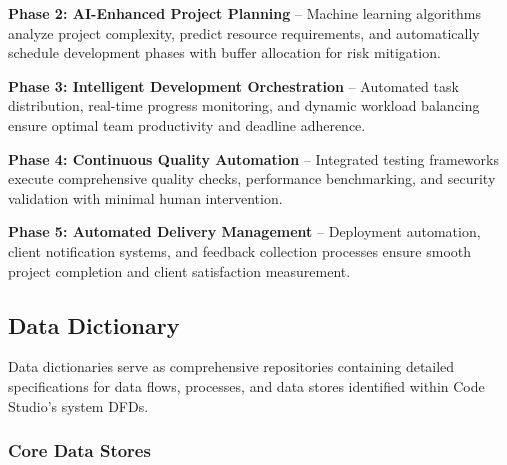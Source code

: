\documentclass[12pt,a4paper]{article}
\begin{document}
\textbf{Phase 2: AI-Enhanced Project Planning} – Machine learning algorithms analyze project complexity, predict resource requirements, and automatically schedule development phases with buffer allocation for risk mitigation.

\textbf{Phase 3: Intelligent Development Orchestration} – Automated task distribution, real-time progress monitoring, and dynamic workload balancing ensure optimal team productivity and deadline adherence.

\textbf{Phase 4: Continuous Quality Automation} – Integrated testing frameworks execute comprehensive quality checks, performance benchmarking, and security validation with minimal human intervention.

\textbf{Phase 5: Automated Delivery Management} – Deployment automation, client notification systems, and feedback collection processes ensure smooth project completion and client satisfaction measurement.

\subsection{Data Dictionary}

Data dictionaries serve as comprehensive repositories containing detailed specifications for data flows, processes, and data stores identified within Code Studio's system DFDs.

\subsubsection{Core Data Stores}
\end{document}
